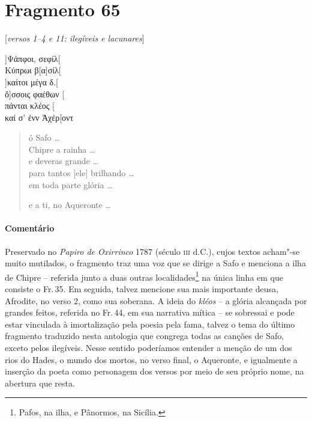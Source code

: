 \pagebreak


\section{Fragmento 65}

\begin{gkverse}

\textnormal{[\textit{versos 1--4 e 11: ilegíveis e lacunares}]}

]Ψάπφοι, σεφίλ[\\
Κύπρωι β[α]σίλ[\\
]καίτοι μέγα δ.[\\
ὄ]σσοις φαέθων [\\
πάνται κλέος [\\
καί σ’ ἐνν Ἀχέρ[οντ 
\end{gkverse}

\begin{verse}
ó Safo \ldots{}\\
[em] Chipre a rainha \ldots{}\\
e deveras grande \ldots{}\\
para tantos [ele] brilhando \ldots{}\\
em toda parte glória \ldots{}

e a ti, no Aqueronte \ldots{}\\
\end{verse}

\medskip

{\paragraph{Comentário} Preservado no \textit{Papiro de Oxirrinco} 1787  (século \textsc{iii} d.C.), cujos textos acham"-se muito mutilados, o fragmento traz uma voz que se dirige a Safo e menciona a ilha de Chipre -- referida junto a duas outras localidades\footnote{Pafos, na ilha, e Pânormos, na Sicília.} na única linha em que consiste o Fr.\,35. Em seguida, talvez mencione sua mais importante deusa, Afrodite, no verso 2, como sua soberana. A ideia do \textit{kléos} -- a glória alcançada por grandes feitos, referida no Fr.\,44, em sua narrativa mítica -- se sobressai e pode estar vinculada à imortalização pela poesia pela fama, talvez o tema do último fragmento traduzido nesta antologia que congrega todas as canções de Safo, exceto pelos ilegíveis. Nesse sentido poderíamos entender a menção de um dos rios do Hades, o mundo dos mortos, no verso final, o Aqueronte, e igualmente a inserção da poeta como personagem dos versos por meio de seu próprio nome, na abertura que resta.}

